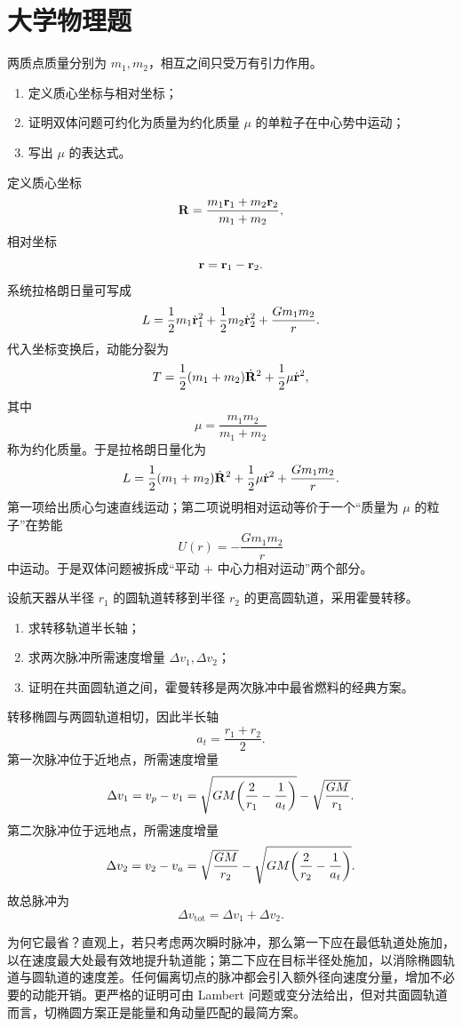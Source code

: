 \section{大学物理题}

\begin{university}
两质点质量分别为 $m_1,m_2$，相互之间只受万有引力作用。
\begin{enumerate}
  \item 定义质心坐标与相对坐标；
  \item 证明双体问题可约化为质量为约化质量 $\mu$ 的单粒子在中心势中运动；
  \item 写出 $\mu$ 的表达式。
\end{enumerate}
\begin{solution}
定义质心坐标
\[
\vb{R}=\frac{m_1\vb{r}_1+m_2\vb{r}_2}{m_1+m_2},
\]
相对坐标
\[
\vb{r}=\vb{r}_1-\vb{r}_2.
\]
系统拉格朗日量可写成
\[
L=\frac12 m_1 \dot{\vb{r}}_1^2+\frac12 m_2 \dot{\vb{r}}_2^2+\frac{Gm_1m_2}{r}.
\]
代入坐标变换后，动能分裂为
\[
T=\frac12 (m_1+m_2)\dot{\vb{R}}^2+\frac12 \mu \dot{\vb{r}}^2,
\]
其中
\[
\mu=\frac{m_1m_2}{m_1+m_2}
\]
称为约化质量。于是拉格朗日量化为
\[
L=\frac12 (m_1+m_2)\dot{\vb{R}}^2+\frac12 \mu \dot{\vb{r}}^2+\frac{Gm_1m_2}{r}.
\]
第一项给出质心匀速直线运动；第二项说明相对运动等价于一个“质量为 $\mu$ 的粒子”在势能
\[
U(r)=-\frac{Gm_1m_2}{r}
\]
中运动。于是双体问题被拆成“平动 $+$ 中心力相对运动”两个部分。
\end{solution}
\end{university}

\begin{university}
设航天器从半径 $r_1$ 的圆轨道转移到半径 $r_2$ 的更高圆轨道，采用霍曼转移。
\begin{enumerate}
  \item 求转移轨道半长轴；
  \item 求两次脉冲所需速度增量 $\Delta v_1,\Delta v_2$；
  \item 证明在共面圆轨道之间，霍曼转移是两次脉冲中最省燃料的经典方案。
\end{enumerate}
\begin{solution}
转移椭圆与两圆轨道相切，因此半长轴
\[
a_t=\frac{r_1+r_2}{2}.
\]
第一次脉冲位于近地点，所需速度增量
\[
\Delta v_1=v_p-v_1=\sqrt{GM\qty(\frac{2}{r_1}-\frac{1}{a_t})}-\sqrt{\frac{GM}{r_1}}.
\]
第二次脉冲位于远地点，所需速度增量
\[
\Delta v_2=v_2-v_a=\sqrt{\frac{GM}{r_2}}-\sqrt{GM\qty(\frac{2}{r_2}-\frac{1}{a_t})}.
\]
故总脉冲为
\[
\Delta v_{\text{tot}}=\Delta v_1+\Delta v_2.
\]

为何它最省？直观上，若只考虑两次瞬时脉冲，那么第一下应在最低轨道处施加，以在速度最大处最有效地提升轨道能；第二下应在目标半径处施加，以消除椭圆轨道与圆轨道的速度差。任何偏离切点的脉冲都会引入额外径向速度分量，增加不必要的动能开销。更严格的证明可由 Lambert 问题或变分法给出，但对共面圆轨道而言，切椭圆方案正是能量和角动量匹配的最简方案。
\end{solution}
\end{university}

